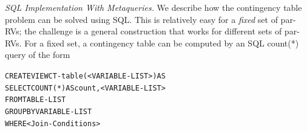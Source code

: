 \documentclass{IEEEtran}
\begin{document}

{\em SQL Implementation With Metaqueries.}
We describe how the contingency table problem can be solved using SQL. %
This is relatively easy for a {\em fixed} set of par-RVs; the challenge is a general construction that works for different sets of par-RVs. For a fixed set, a  contingency table can be computed by an SQL count(*) query of the form 
%
%
\begin{alltt}
CREATE VIEW CT-table(<VARIABLE-LIST>) AS
SELECT COUNT(*) AS count, <VARIABLE-LIST>
FROM TABLE-LIST
GROUP BY VARIABLE-LIST
WHERE <Join-Conditions>
\end{alltt}
\end{document}
